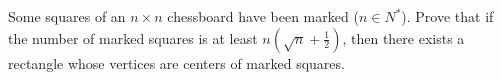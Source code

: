 Some squares of an $n \times n$ chessboard have been marked ($n \in N^*$). Prove that if the number of marked squares is at least $n\left(\sqrt{n} + \frac12\right)$, then there exists a rectangle whose vertices are centers of marked squares.